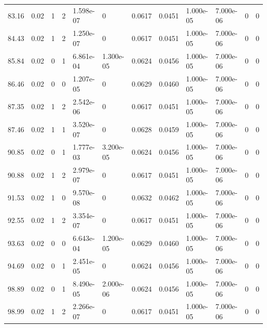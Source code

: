 \documentclass[preview]{standalone}
\begin{document}
{{{\begin{tabular}{L{1.2cm}C{1.2cm} C{0.3cm}C{0.5cm} C{1.4cm}C{1.4cm} C{1.4cm}C{1.4cm} C{1.6cm}C{1.6cm} C{1.6cm}C{1.6cm}}
  83.16  &  0.02  & 1     &  2 &  1.598e-07  & 0  &  0.0617&   0.0451& 1.000e-05 & 7.000e-06   &  0 & 0  \\ 
  84.43  &  0.02  & 1     &  2 &  1.250e-07  & 0  &  0.0617&   0.0451& 1.000e-05 & 7.000e-06   &  0 & 0  \\ 
  85.84  &  0.02  & 0     &  1 &  6.861e-04  & 1.300e-05  &  0.0624&   0.0456& 1.000e-05 & 7.000e-06   &  0 & 0  \\ 
  86.46  &  0.02  & 0     &  0 &  1.207e-05  & 0  &  0.0629&   0.0460& 1.000e-05 & 7.000e-06   &  0 & 0  \\ 
  87.35  &  0.02  & 1     &  2 &  2.542e-06  & 0  &  0.0617&   0.0451& 1.000e-05 & 7.000e-06   &  0 & 0  \\ 
  87.46  &  0.02  & 1     &  1 &  3.520e-07  & 0  &  0.0628&   0.0459& 1.000e-05 & 7.000e-06   &  0 & 0  \\ 
  90.85  &  0.02  & 0     &  1 &  1.777e-03  & 3.200e-05  &  0.0624&   0.0456& 1.000e-05 & 7.000e-06   &  0 & 0  \\ 
  90.88  &  0.02  & 1     &  2 &  2.979e-07  & 0  &  0.0617&   0.0451& 1.000e-05 & 7.000e-06   &  0 & 0  \\ 
  91.53  &  0.02  & 1     &  0 &  9.570e-08  & 0  &  0.0632&   0.0462& 1.000e-05 & 7.000e-06   &  0 & 0  \\ 
  92.55  &  0.02  & 1     &  2 &  3.354e-07  & 0  &  0.0617&   0.0451& 1.000e-05 & 7.000e-06   &  0 & 0  \\ 
  93.63  &  0.02  & 0     &  0 &  6.643e-04  & 1.200e-05  &  0.0629&   0.0460& 1.000e-05 & 7.000e-06   &  0 & 0  \\ 
  94.69  &  0.02  & 0     &  1 &  2.451e-05  & 0  &  0.0624&   0.0456& 1.000e-05 & 7.000e-06   &  0 & 0  \\ 
  98.89  &  0.02  & 0     &  1 &  8.490e-05  & 2.000e-06  &  0.0624&   0.0456& 1.000e-05 & 7.000e-06   &  0 & 0  \\ 
  98.99  &  0.02  & 1     &  2 &  2.266e-07  & 0  &  0.0617&   0.0451& 1.000e-05 & 7.000e-06   &  0 & 0  \\ 
\hline 
\end{tabular} 

}}}
\end{document}
